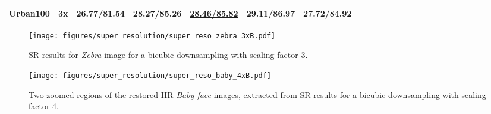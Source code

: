 \documentclass[10pt,journal,compsoc]{IEEEtran}
\newcommand\bdr[1]{{\textbf{#1}}}
\newcommand\bdb[1]{{\underline{#1}}}
\begin{document}
\begin{table}[t!]
\begin{scriptsize}
\begin{center}
\begin{tabular}{l c ccccc}
\hline


\multirow{1}{*}{Urban100}

& 3x & 26.77/81.54 & 28.27/85.26 & \bdb{28.46/85.82} & \bdr{29.11/86.97} & 27.72/84.92\\

\hline

\end{tabular}\end{center}
\end{scriptsize}
\end{table}





\begin{figure*}[t!]
\begin{centering}

\texttt{[image: figures/super\_resolution/super\_reso\_zebra\_3xB.pdf]}

\end{centering}
\caption{SR results for \textit{Zebra} image for a bicubic downsampling with scaling factor 3.}
\label{fig:image_super_resoBx3}
\end{figure*}




\begin{figure*}[t!]
\begin{centering}

\texttt{[image: figures/super\_resolution/super\_reso\_baby\_4xB.pdf]}

\end{centering}
\caption{Two zoomed regions of the restored HR \textit{Baby-face} images, extracted from SR results for a bicubic downsampling with scaling factor 4.}
\label{fig:image_super_resoBx4}
\end{figure*}
\end{document}
